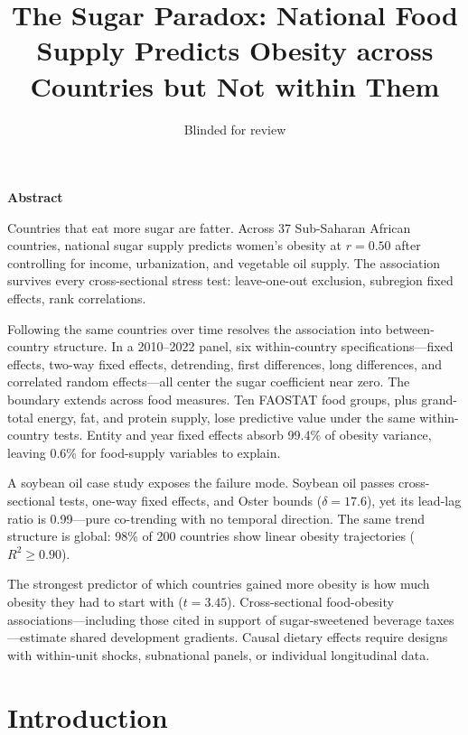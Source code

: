 \documentclass[letterpaper,11pt,leqno]{article}
\title{The Sugar Paradox: National Food Supply Predicts Obesity across Countries but Not within Them}
\author{Blinded for review}
\date{}
\begin{document}
\begin{titlepage}
\maketitle

\bigskip
\noindent\textbf{Abstract}
\medskip

\noindent Countries that eat more sugar are fatter.
Across 37 Sub-Saharan African countries, national sugar supply predicts women's obesity at $r = 0.50$ after controlling for income, urbanization, and vegetable oil supply.
The association survives every cross-sectional stress test: leave-one-out exclusion, subregion fixed effects, rank correlations.

Following the same countries over time resolves the association into between-country structure.
In a 2010--2022 panel, six within-country specifications---fixed effects, two-way fixed effects, detrending, first differences, long differences, and correlated random effects---all center the sugar coefficient near zero.
The boundary extends across food measures. Ten FAOSTAT food groups, plus grand-total energy, fat, and protein supply, lose predictive value under the same within-country tests. Entity and year fixed effects absorb 99.4\% of obesity variance, leaving 0.6\% for food-supply variables to explain.

A soybean oil case study exposes the failure mode. Soybean oil passes cross-sectional tests, one-way fixed effects, and Oster bounds ($\delta = 17.6$), yet its lead-lag ratio is 0.99---pure co-trending with no temporal direction. The same trend structure is global: 98\% of 200 countries show linear obesity trajectories ($R^2 \geq 0.90$).

The strongest predictor of which countries gained more obesity is how much obesity they had to start with ($t = 3.45$). Cross-sectional food-obesity associations---including those cited in support of sugar-sweetened beverage taxes---estimate shared development gradients. Causal dietary effects require designs with within-unit shocks, subnational panels, or individual longitudinal data.

\end{titlepage}

\section{Introduction}
\end{document}
